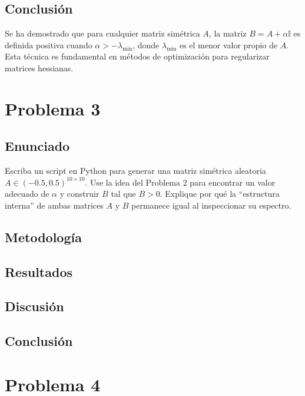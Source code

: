 \documentclass{article}
\begin{document}
\subsection{Conclusión}

Se ha demostrado que para cualquier matriz simétrica $A$, la matriz $B = A + \alpha \mathbb{I}$ es definida positiva cuando $\alpha > -\lambda_{\min}$, donde $\lambda_{\min}$ es el menor valor propio de $A$. Esta técnica es fundamental en métodos de optimización para regularizar matrices hessianas.

\section{Problema 3}

\subsection{Enunciado}
Escriba un script en Python para generar una matriz simétrica aleatoria $A \in (-0.5, 0.5)^{10 \times 10}$. Use la idea del Problema 2 para encontrar un valor adecuado de $\alpha$ y construir $B$ tal que $B > 0$. Explique por qué la ``estructura interna'' de ambas matrices $A$ y $B$ permanece igual al inspeccionar su espectro.

\subsection{Metodología}

\subsection{Resultados}
\setcounter{equation}{0}

\subsection{Discusión}

\subsection{Conclusión}

\section{Problema 4}
\end{document}
